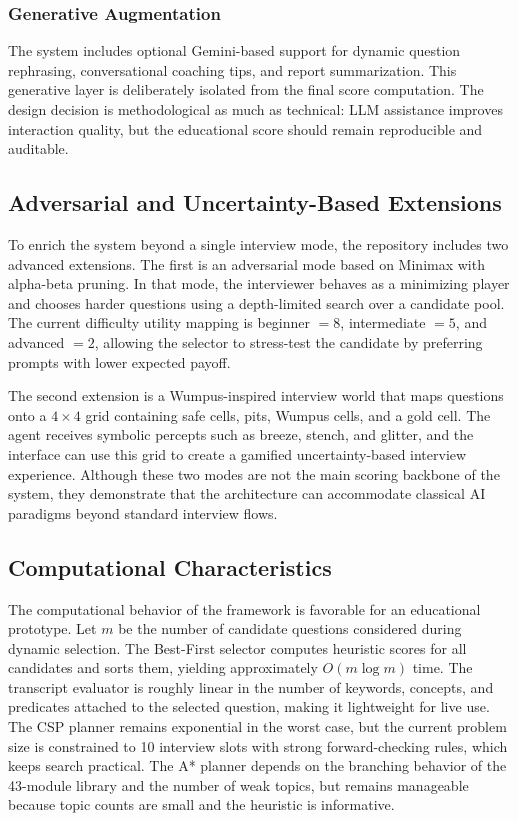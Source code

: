\documentclass[conference]{IEEEtran}
\begin{document}
\subsubsection{Generative Augmentation}
The system includes optional Gemini-based support for dynamic question rephrasing, conversational coaching tips, and report summarization. This generative layer is deliberately isolated from the final score computation. The design decision is methodological as much as technical: LLM assistance improves interaction quality, but the educational score should remain reproducible and auditable.

\subsection{Adversarial and Uncertainty-Based Extensions}
To enrich the system beyond a single interview mode, the repository includes two advanced extensions. The first is an adversarial mode based on Minimax with alpha-beta pruning. In that mode, the interviewer behaves as a minimizing player and chooses harder questions using a depth-limited search over a candidate pool. The current difficulty utility mapping is beginner $=8$, intermediate $=5$, and advanced $=2$, allowing the selector to stress-test the candidate by preferring prompts with lower expected payoff.

The second extension is a Wumpus-inspired interview world that maps questions onto a $4 \times 4$ grid containing safe cells, pits, Wumpus cells, and a gold cell. The agent receives symbolic percepts such as breeze, stench, and glitter, and the interface can use this grid to create a gamified uncertainty-based interview experience. Although these two modes are not the main scoring backbone of the system, they demonstrate that the architecture can accommodate classical AI paradigms beyond standard interview flows.

\subsection{Computational Characteristics}
The computational behavior of the framework is favorable for an educational prototype. Let $m$ be the number of candidate questions considered during dynamic selection. The Best-First selector computes heuristic scores for all candidates and sorts them, yielding approximately $O(m \log m)$ time. The transcript evaluator is roughly linear in the number of keywords, concepts, and predicates attached to the selected question, making it lightweight for live use. The CSP planner remains exponential in the worst case, but the current problem size is constrained to 10 interview slots with strong forward-checking rules, which keeps search practical. The A* planner depends on the branching behavior of the 43-module library and the number of weak topics, but remains manageable because topic counts are small and the heuristic is informative.
\end{document}
